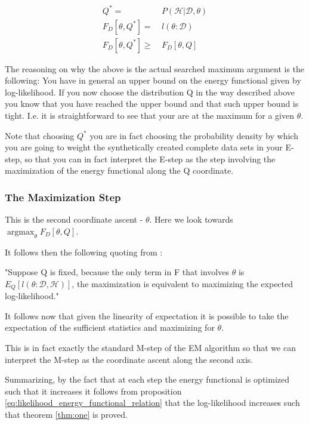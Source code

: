 \documentclass[11pt]{article}
\begin{document}
\begin{article}
\begin{align} \label{eq:q_optimum}
Q^* =& \ P (\mathscr{H}|\mathscr{D}, \theta) \\
F_D[\theta, Q^*] =& \ l (\theta: \mathscr{D}) \\
F_D[\theta, Q^*] \geq& \ F_D[\theta, Q]
\end{align}

The reasoning on why the above is the actual searched maximum
argument is the following: You have in general an upper bound on the
energy functional given by log-likelihood. If you now choose the
distribution Q in the way described above you know that you have
reached the upper bound and that such upper bound is tight. I.e. it
is straightforward to see that your are at the maximum for a given
\(\theta\).

Note that choosing \(Q^*\) you are in fact choosing the probability
density by which you are going to weight the synthetically created
complete data sets in your E-step, so that you can in fact
interpret the E-step as the step involving the maximization of the
energy functional along the Q coordinate.

\subsubsection{The Maximization Step}
\label{sec:org64dafc4}

This is the second coordinate ascent - \(\theta\). Here we look
towards \(\operatorname*{argmax}_{\theta} F_D[\theta, Q]\).

It follows then the following quoting from
\cite{koller2009probabilistic}:

"Suppose Q is fixed, because the only term in F that involves \(\theta\) is
\(E_Q[l (\theta: \mathscr{D}, \mathscr{H})]\), the maximization is
equivalent to maximizing the expected log-likelihood."

It follows now that given the linearity of expectation it is
possible to take the expectation of the sufficient statistics and
maximizing for \(\theta\).

This is in fact exactly the standard M-step of the EM algorithm so
that we can interpret the M-step as the coordinate ascent along
the second axis. 

Summarizing, by the fact that at each step the energy functional is
optimized such that it increases it follows from proposition
\ref{eq:likelihood_energy_functional_relation} that the
log-likelihood increases such that theorem \ref{thm:one} is proved.



\end{article}
\end{document}
